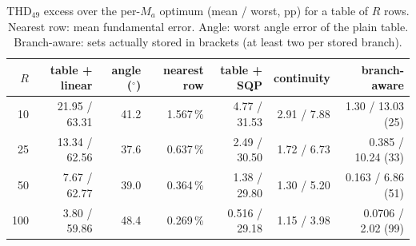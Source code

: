 \begin{table}[!t]
\centering
\caption{THD$_{49}$ excess over the per-$M_a$ optimum (mean / worst, pp) for a table of $R$ rows. Nearest row: mean fundamental error. Angle: worst angle error of the plain table. Branch-aware: sets actually stored in brackets (at least two per stored branch).}
\label{tab:lut}
\footnotesize
\setlength{\tabcolsep}{4pt}
\begin{tabular}{rrrrrrr}
\toprule
$R$ & table + linear & angle ($^\circ$) & nearest row & table + SQP & continuity & branch-aware \\
\midrule
10 & 21.95 / 63.31 & 41.2 & 1.567\,\% & 4.77 / 31.53 & 2.91 / 7.88 & 1.30 / 13.03 (25) \\
25 & 13.34 / 62.56 & 37.6 & 0.637\,\% & 2.49 / 30.50 & 1.72 / 6.73 & 0.385 / 10.24 (33) \\
50 & 7.67 / 62.77 & 39.0 & 0.364\,\% & 1.38 / 29.80 & 1.30 / 5.20 & 0.163 / 6.86 (51) \\
100 & 3.80 / 59.86 & 48.4 & 0.269\,\% & 0.516 / 29.18 & 1.15 / 3.98 & 0.0706 / 2.02 (99) \\
\bottomrule
\end{tabular}
\end{table}
